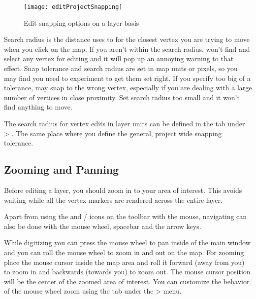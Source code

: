 \begin{figure}[ht]
   \centering
   \texttt{[image: editProjectSnapping]}
   \caption{Edit snapping options on a layer basis \nixcaption}\label{fig:snappingoptions}
\end{figure}


Search radius is the distance \qg uses to  for the closest
vertex you are trying to move when you click on the
map. If you aren't within the search radius, \qg won't find and select
any vertex for editing and it will pop up an annoying warning to that effect.
Snap tolerance and search radius are set in map units or pixels, so you may find you
need to experiment to get them set right. If you specify too big of a
tolerance, \qg may snap to the wrong vertex, especially if you are dealing
with a large number of vertices in close proximity. Set search radius too
small and it won't find anything to move.

The search radius for vertex edits in layer units can be defined in the
 tab under  >
. The same place where you define the
general, project wide snapping tolerance.

\subsection{Zooming and Panning}

Before editing a layer, you should zoom in to your area of interest. This
avoids waiting while all the vertex markers are rendered across the entire
layer.

Apart from using the  and
/
icons on the toolbar with the mouse, navigating can also be done with the
mouse wheel, spacebar and the arrow keys.


While digitizing you can press the mouse wheel to pan inside of the main
window and you can roll the mouse wheel to zoom in and out on the map. For
zooming place the mouse cursor inside the map area and roll it forward (away
from you)
to zoom in and backwards (towards you) to zoom out. The mouse cursor position
will
be the center of the zoomed area of interest. You can customize the behavior
of the mouse wheel zoom using the  tab under the
 > menu.

